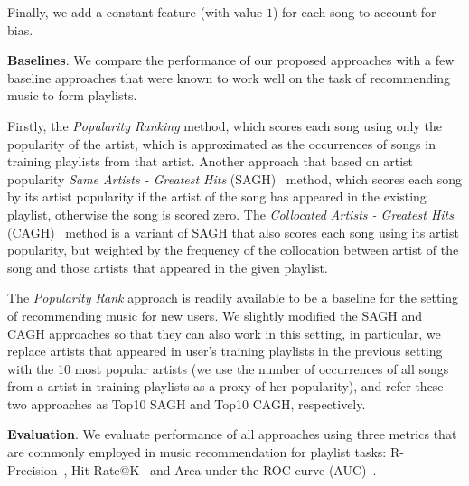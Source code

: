 Finally, we add a constant feature (with value $1$) for each song to account for bias. %


{\bf Baselines}.
We compare the performance of our proposed approaches with a few baseline approaches
that were known to work well on the task of recommending music to form playlists.

Firstly, the {\it Popularity Ranking} method, which scores each song using only the popularity of the artist,
which is approximated as the occurrences of songs in training playlists from that artist.
%
Another approach that based on artist popularity {\it Same Artists - Greatest Hits} (SAGH)~\cite{mcfee2012million} method,
which scores each song by its artist popularity if the artist of the song has appeared in the existing playlist,
otherwise the song is scored zero.
%
The {\it Collocated Artists - Greatest Hits} (CAGH)~\cite{bonnin2013evaluating} method is a variant of SAGH
that also scores each song using its artist popularity, but weighted by the frequency of the collocation between artist of the song
and those artists that appeared in the given playlist.



The {\it Popularity Rank} approach is readily available to be a baseline for the setting of recommending music for new users.
%
We slightly modified the SAGH and CAGH approaches so that they can also work in this setting,
in particular, we replace artists that appeared in user's training playlists in the previous setting with the 10 most popular artists
(we use the number of occurrences of all songs from a artist in training playlists as a proxy of her popularity),
and refer these two approaches as Top10 SAGH and Top10 CAGH, respectively.



{\bf Evaluation}.
We evaluate performance of all approaches using three metrics that are commonly employed in music recommendation for playlist tasks:
R-Precision~\cite{manning2008introIR}, Hit-Rate@K~\cite{hariri2012context} and Area under the ROC curve (AUC)~\cite{manning2008introIR}.

